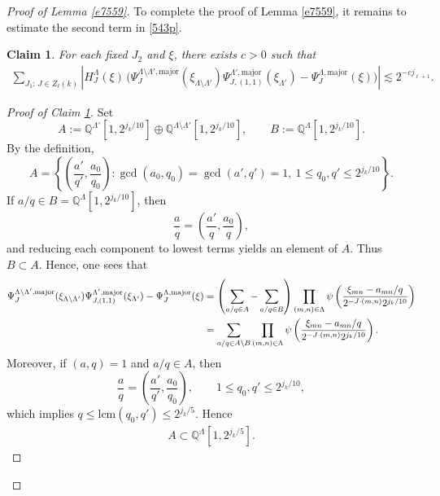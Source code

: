 \documentclass[11 pt,letterpaper]{amsart}
\theoremstyle{plain}
\newtheorem{claim}{Claim}\numberwithin{claim}{section}
\theoremstyle{definition}
\theoremstyle{remark} \theoremstyle{exam} \theoremstyle{ob}
\numberwithin{equation}{section}
\begin{document}
\begin{proof}[Proof of Lemma \ref{e7559}]
 

To complete the proof of Lemma \ref{e7559}, it remains to estimate the second term in \eqref{543p}.

\begin{claim}\label{to77}
For each fixed $J_2$ and $\xi$, there exists $c>0$ such that
\begin{align*}
\sum_{J_1:\, J\in Z_\ell(k)}
\left|
H^{\Lambda}_{J}(\xi)\,
\Big(
\Psi_J^{\Lambda\setminus\Lambda',\mathrm{major}}(\xi_{\Lambda\setminus\Lambda'})
\Psi_{J,(1,1)}^{\Lambda',\mathrm{major}}(\xi_{\Lambda'})
-
\Psi_J^{\Lambda,\mathrm{major}}(\xi)
\Big)
\right|
\lesssim 2^{-c j_{\ell+1}}.
\end{align*}
\end{claim}

\begin{proof}[Proof of Claim \ref{to77}]
Set
\[
A:=\mathbb{Q}^{\Lambda'}[1,2^{j_k/10}]\oplus\mathbb{Q}^{\Lambda\setminus \Lambda'}[1,2^{j_k/10}],
\qquad
B:=\mathbb{Q}^{\Lambda}[1,2^{j_k/10}].
\]
By the definition,
\[
A
=
\left\{
\left(\frac{a'}{q'},\frac{a_0}{q_0}\right):
\gcd(a_0,q_0)=\gcd(a',q')=1,\ 
1\le q_0,q'\le 2^{j_k/10}
\right\}.
\]
If $a/q\in B=\mathbb{Q}^{\Lambda}[1,2^{j_k/10}]$, then
\[
\frac{a}{q}
=
\left(\frac{a'}{q},\frac{a_0}{q}\right),
\]
and reducing each component to lowest terms yields an element of $A$.
Thus $B\subset A$. Hence, one sees that
\begin{align}
\Psi_{J}^{\Lambda\setminus \Lambda',\mathrm{major}}(\xi_{\Lambda\setminus\Lambda'})
\Psi_{J,(1,1)}^{\Lambda',\mathrm{major}}(\xi_{\Lambda'})
-
\Psi_{J}^{\Lambda,\mathrm{major}}(\xi)
&=
\left(\sum_{a/q\in A}-\sum_{a/q\in B}\right)
\prod_{(m,n)\in\Lambda}
\psi\left(
\frac{\xi_{mn}-a_{mn}/q}{2^{-J\cdot(m,n)}2^{j_k/10}}
\right)\notag \\
&=
\sum_{a/q\in A\setminus B}
\prod_{(m,n)\in\Lambda}
\psi\left(
\frac{\xi_{mn}-a_{mn}/q}{2^{-J\cdot(m,n)}2^{j_k/10}}
\right).\label{t6}
\end{align}
Moreover, if $(a,q)=1$ and $a/q\in A$, then
\[
\frac{a}{q}
=
\left(\frac{a'}{q'},\frac{a_0}{q_0}\right),
\qquad
1\le q_0,q'\le 2^{j_k/10},
\]
which implies
$q \le \mathrm{lcm}(q_0,q') \le 2^{j_k/5}.$
Hence \begin{align}\label{ii}
	A\subset \mathbb{Q}^{\Lambda}[1,2^{j_k/5}].
\end{align}


\end{proof}
\end{proof}
\end{document}
